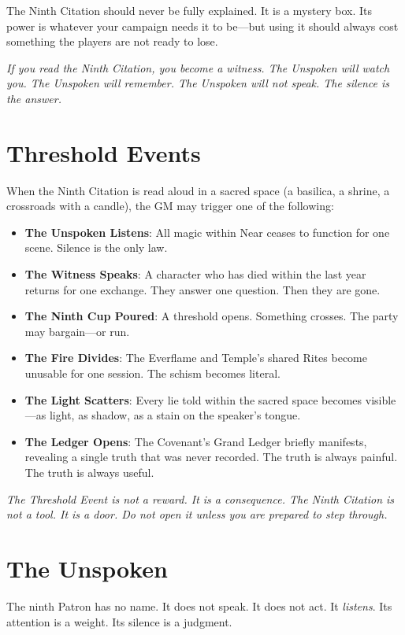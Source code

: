 \documentclass{book}
\newcommand{\citation}[1]{\textcolor{marginalia}{\small\textit{#1}}}
\begin{document}
The Ninth Citation should never be fully explained. It is a mystery box. Its power is whatever your campaign needs it to be---but using it should always cost something the players are not ready to lose.

\citation{If you read the Ninth Citation, you become a witness. The Unspoken will watch you. The Unspoken will remember. The Unspoken will not speak. The silence is the answer.}

\section{Threshold Events}

When the Ninth Citation is read aloud in a sacred space (a basilica, a shrine, a crossroads with a candle), the GM may trigger one of the following:

\begin{itemize}
\item \textbf{The Unspoken Listens}: All magic within Near ceases to function for one scene. Silence is the only law.
\item \textbf{The Witness Speaks}: A character who has died within the last year returns for one exchange. They answer one question. Then they are gone.
\item \textbf{The Ninth Cup Poured}: A threshold opens. Something crosses. The party may bargain---or run.
\item \textbf{The Fire Divides}: The Everflame and Temple's shared Rites become unusable for one session. The schism becomes literal.
\item \textbf{The Light Scatters}: Every lie told within the sacred space becomes visible---as light, as shadow, as a stain on the speaker's tongue.
\item \textbf{The Ledger Opens}: The Covenant's Grand Ledger briefly manifests, revealing a single truth that was never recorded. The truth is always painful. The truth is always useful.
\end{itemize}

\citation{The Threshold Event is not a reward. It is a consequence. The Ninth Citation is not a tool. It is a door. Do not open it unless you are prepared to step through.}

\section{The Unspoken}

The ninth Patron has no name. It does not speak. It does not act. It \textit{listens}. Its attention is a weight. Its silence is a judgment.
\end{document}

